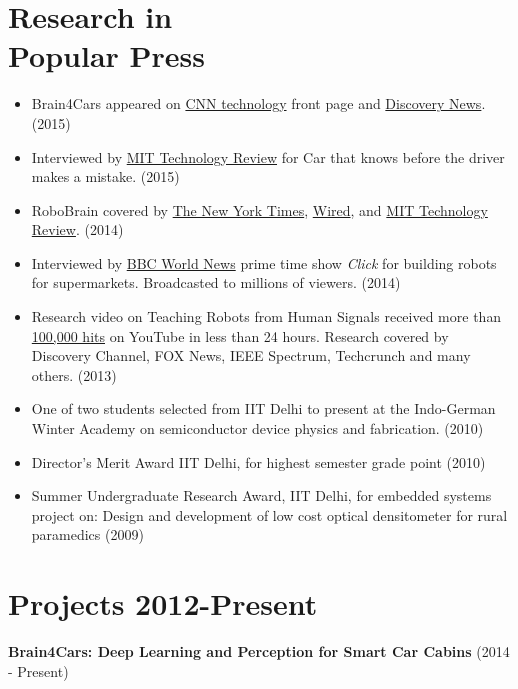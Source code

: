 \documentclass[line,margin]{res}
\begin{document}
\begin{resume}
 \section{Research in  \\ Popular Press \\ } 
 \vspace{-4mm}
\hspace{-4mm}
\begin{itemize}
\item Brain4Cars appeared on \href{http://money.cnn.com/video/news/2015/04/16/brain4cars-can-predict-driver-error-cornell-stanford.cnnmoney/}{CNN technology} front page and \href{http://news.discovery.com/autos/future-of-transportation/car-predicts-driving-mistakes-before-they-happen-150417.htm}{Discovery News}. (2015)
\item Interviewed by \href{http://www.technologyreview.com/news/541866/this-car-knows-your-next-misstep-before-you-make-it/}{MIT Technology Review} for Car that knows before the driver makes a mistake. (2015)
\item RoboBrain covered by \href{http://www.nytimes.com/2014/09/02/science/robot-touch.html?_r=0}{The New York Times}, \href{http://www.wired.com/2014/08/robobrain/}{Wired}, and \href{http://www.technologyreview.com/view/533471/robobrain-the-worlds-first-knowledge-engine-for-robots/}{MIT Technology Review}. (2014)
\item Interviewed by \href{http://www.bbc.com/news/technology-25465672}{BBC World News} prime time show \textit{Click} for building robots
for supermarkets. Broadcasted to millions of viewers. (2014)
\item Research video on Teaching Robots from Human Signals received more than
\href{https://www.youtube.com/watch?v=uLktpkd7ojA}{100,000 hits} on YouTube in less than 24 hours. Research covered by Discovery Channel, FOX
News, IEEE Spectrum, Techcrunch and many others. (2013)
\item One of two students selected from IIT Delhi to present at the Indo-German
Winter Academy on semiconductor device physics and fabrication. (2010)
\item Director's Merit Award IIT Delhi, for highest semester grade point (2010)
\item Summer Undergraduate Research Award, IIT Delhi, for embedded systems
project on: Design and development of low cost optical densitometer for rural
paramedics (2009)
\end{itemize} 

\section{Projects 2012-Present}
{\bf Brain4Cars: Deep Learning and Perception for Smart Car Cabins} \hfill (2014 - Present)
    

\end{resume}
\end{document}
